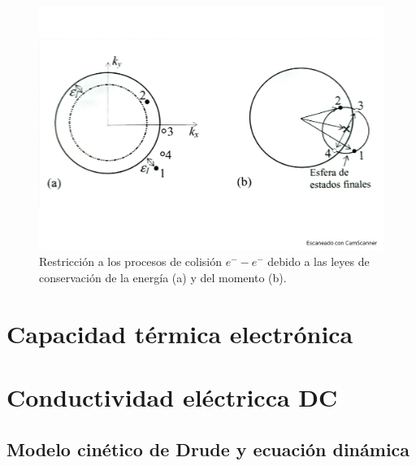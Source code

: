 \begin{figure}[h!] \centering
    \includegraphics[scale=0.5]{Cuerpo/Ch_06/Fotos libro 4.pdf}
    \caption{Restricción a los procesos de colisión $e^- - e^-$ debido a las leyes de conservación de la energía (a) y del momento (b).}
    \label{Fig:06-04}
\end{figure}  

\section{Capacidad térmica electrónica}

\section{Conductividad eléctricca DC}

\subsection{Modelo cinético de Drude y ecuación dinámica}

